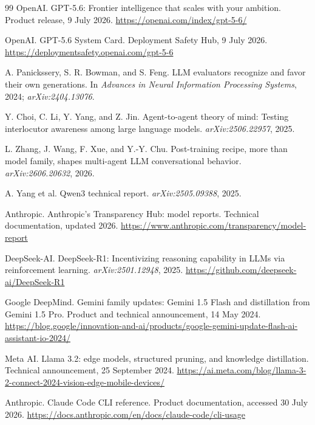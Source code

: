 \documentclass[11pt,a4paper]{article}
\begin{document}
\begin{thebibliography}{99}
OpenAI.
\newblock GPT-5.6: Frontier intelligence that scales with your ambition.
\newblock Product release, 9 July 2026. \url{https://openai.com/index/gpt-5-6/}

OpenAI.
\newblock GPT-5.6 System Card.
\newblock Deployment Safety Hub, 9 July 2026. \url{https://deploymentsafety.openai.com/gpt-5-6}

A. Panickssery, S. R. Bowman, and S. Feng.
\newblock LLM evaluators recognize and favor their own generations.
\newblock In \emph{Advances in Neural Information Processing Systems}, 2024; \emph{arXiv:2404.13076}.

Y. Choi, C. Li, Y. Yang, and Z. Jin.
\newblock Agent-to-agent theory of mind: Testing interlocutor awareness among large language models.
\newblock \emph{arXiv:2506.22957}, 2025.

L. Zhang, J. Wang, F. Xue, and Y.-Y. Chu.
\newblock Post-training recipe, more than model family, shapes multi-agent LLM conversational behavior.
\newblock \emph{arXiv:2606.20632}, 2026.

A. Yang et al.
\newblock Qwen3 technical report.
\newblock \emph{arXiv:2505.09388}, 2025.

Anthropic.
\newblock Anthropic's Transparency Hub: model reports.
\newblock Technical documentation, updated 2026. \url{https://www.anthropic.com/transparency/model-report}

DeepSeek-AI.
\newblock DeepSeek-R1: Incentivizing reasoning capability in LLMs via reinforcement learning.
\newblock \emph{arXiv:2501.12948}, 2025. \url{https://github.com/deepseek-ai/DeepSeek-R1}

Google DeepMind.
\newblock Gemini family updates: Gemini 1.5 Flash and distillation from Gemini 1.5 Pro.
\newblock Product and technical announcement, 14 May 2024. \url{https://blog.google/innovation-and-ai/products/google-gemini-update-flash-ai-assistant-io-2024/}

Meta AI.
\newblock Llama 3.2: edge models, structured pruning, and knowledge distillation.
\newblock Technical announcement, 25 September 2024. \url{https://ai.meta.com/blog/llama-3-2-connect-2024-vision-edge-mobile-devices/}

Anthropic.
\newblock Claude Code CLI reference.
\newblock Product documentation, accessed 30 July 2026. \url{https://docs.anthropic.com/en/docs/claude-code/cli-usage}


\end{thebibliography}
\end{document}

